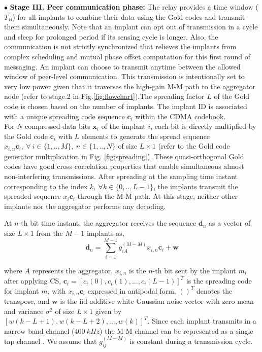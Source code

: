 \noindent $\bullet$ \textbf{Stage III. Peer communication phase:} The relay provides a time window ($T_B$) for all implants to combine their data using the Gold codes and transmit them simultaneously. 
Note that an implant can opt out of transmission in a cycle and sleep for prolonged period if its sensing cycle is longer. Also, the communication is not strictly synchronized that relieves the implants from complex scheduling and mutual phase offset computation for this first round of messaging. An implant can choose to transmit anytime between the allowed window of peer-level communication.
This transmission is intentionally set to very low power given that it traverses the high-gain M-M path to the aggregator node (refer to stage.2 in Fig.\ref{fig:flowchart}).The spreading factor $L$ of the Gold code is chosen based on the number of implants. The implant ID is associated with a unique spreading code sequence $\mathbf{c}_i$ within the CDMA codebook.\\ 
For $N$ compressed data bits $\mathbf{x}_i$ of the implant $i$, each
bit is directly multiplied by the Gold code $\mathbf{c}_i$ with $L$ elements to generate the spread sequence $x_{i,n}\mathbf{c}_i,\ \forall \ i\in\{1,..,M\},\  n\in\{1,..,N\}$ of size $L\times 1$ (refer to the Gold code generator multiplication in  Fig. \ref{fig:spreading}). These quasi-orthogonal Gold codes have good cross correlation properties that enable simultaneous almost non-interfering transmissions. After spreading at the sampling time instant corresponding to the index $k,\ \forall k \in \{0,..,L-1\}$, the implants transmit the spreaded sequence $x_i\mathbf{c}_i$ through the M-M path. At this stage, neither other implants nor the aggregator performs any decoding. 

 
At $n$-th bit time instant, the aggregator receives the sequence $\mathbf{d}_n$ as a vector of size $L \times 1$ from the $M-1$ implants as,
\begin{equation}
	\mathbf{d}_n = \sum_{i=1}^{M-1} g_{iA}^{(M-M)} x_{i,n} \mathbf{c}_i  + \mathbf{w} 
	\label{eqCDMA0}
\end{equation}

where $A$ represents the aggregator, $x_{i,n}$ is the $n$-th bit sent by the implant $m_i$ after applying CS,  $\mathbf{c}_i=[c_i(0), c_i(1),..., c_i(L-1)]^T$ is the spreading code for implant $m_i$ with $x_{i,n} \mathbf{c}_i$ expressed in antipodal form, $()^T$ denotes the transpose, and 
$\mathbf{w}$ is the iid additive white Gaussian noise vector with zero mean and variance $\sigma^2$ of size $L \times 1$ given by $[w(k-L+1), w(k-L+2),..., w(k)]^T$. Since each implant transmits in a narrow band channel ($400\ kHz$) the M-M channel can be represented as a single tap channel \cite{tbiocas}. We assume that $g_{ij}^{(M-M)}$ is constant during a transmission cycle. 

